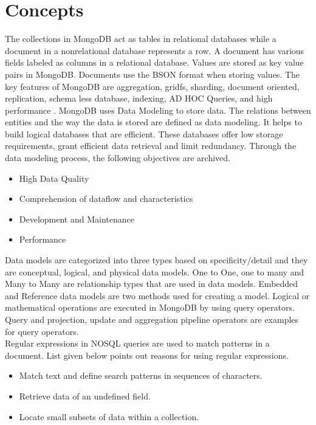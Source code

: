 \documentclass[a4Paper,12pt]{report}
\begin{document}
\section{Concepts}
The collections in MongoDB act as tables in relational databases while a document in a nonrelational database represents a row. A document has various fields labeled as columns in a relational database. Values are stored as key value pairs in MongoDB. Documents use the BSON format when storing values. The key features of MongoDB are aggregation, gridfs, sharding, document oriented, replication, schema less database, indexing, AD HOC Queries, and high performance \cite{noauthor_2018-nz}. MongoDB uses Data Modeling to store data. The relations between entities and the way the data is stored are defined as data modeling. It helps to build logical databases that are efficient. These databases offer low storage requirements, grant efficient data retrieval and limit redundancy. Through the data modeling process, the following objectives are archived.
\begin{itemize}
\item High Data Quality
\item Comprehension of dataflow and characteristics
\item Development and Maintenance
\item Performance
\end{itemize}
Data models are categorized into three types based on specificity/detail and they are conceptual, logical, and physical data models. One to One, one to many and Many to Many are relationship types that are used in data models. Embedded and Reference data models are two methods used for creating a model. Logical or mathematical operations are executed in MongoDB by using query operators. Query and projection, update and aggregation pipeline operators are examples for query operators.\\[12pt]
Regular expressions in NOSQL queries are used to match patterns in a document. List given below points out reasons for using regular expressions.
\begin{itemize}
\item Match text and define search patterns in sequences of characters. 
\item Retrieve data of an undefined field. 
\item Locate small subsets of data within a collection.
\end{itemize}
\end{document}
